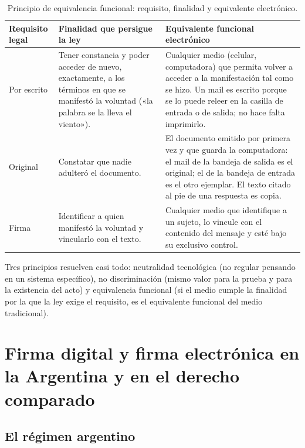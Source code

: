 \documentclass[12pt,oneside]{book}
\begin{document}
\begin{table}[H]
\centering
\small
\caption{Principio de equivalencia funcional: requisito, finalidad y equivalente electrónico.}
\begin{tabularx}{\textwidth}{>{\raggedright\arraybackslash}p{} Y Y}
\toprule
\textbf{Requisito legal} & \textbf{Finalidad que persigue la ley} & \textbf{Equivalente funcional electrónico} \\
\midrule
Por escrito & Tener constancia y poder acceder de nuevo, exactamente, a los términos en que se manifestó la voluntad («la palabra se la lleva el viento»). & Cualquier medio (celular, computadora) que permita volver a acceder a la manifestación tal como se hizo. Un mail es escrito porque se lo puede releer en la casilla de entrada o de salida; no hace falta imprimirlo. \\
Original & Constatar que nadie adulteró el documento. & El documento emitido por primera vez y que guarda la computadora: el mail de la bandeja de salida es el original; el de la bandeja de entrada es el otro ejemplar. El texto citado al pie de una respuesta es copia. \\
Firma & Identificar a quien manifestó la voluntad y vincularlo con el texto. & Cualquier medio que identifique a un sujeto, lo vincule con el contenido del mensaje y esté bajo su exclusivo control. \\
\bottomrule
\end{tabularx}
\end{table}

\begin{important}
Tres principios resuelven casi todo: neutralidad tecnológica (no regular pensando en un sistema específico), no discriminación (mismo valor para la prueba y para la existencia del acto) y equivalencia funcional (si el medio cumple la finalidad por la que la ley exige el requisito, es el equivalente funcional del medio tradicional).
\end{important}

\section{Firma digital y firma electrónica en la Argentina y en el derecho comparado}

\subsection{El régimen argentino}
\end{document}
